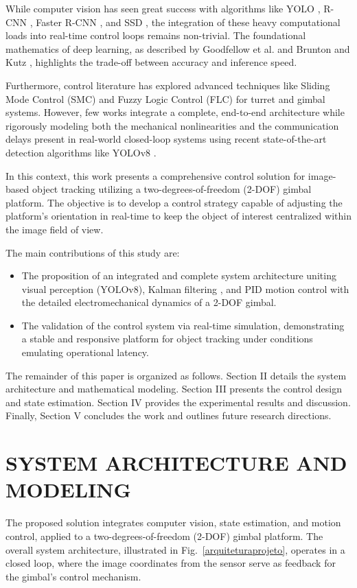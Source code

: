 \documentclass[conference]{IEEEtran}
\begin{document}
While computer vision has seen great success with algorithms like YOLO \cite{YOLO}, R-CNN \cite{6909475}, Faster R-CNN \cite{7485869}, and SSD \cite{Liu_2016}, the integration of these heavy computational loads into real-time control loops remains non-trivial. The foundational mathematics of deep learning, as described by Goodfellow et al. \cite{Goodfellow-et-al-2016} and Brunton and Kutz \cite{Brunton_Kutz_2022}, highlights the trade-off between accuracy and inference speed.

Furthermore, control literature has explored advanced techniques like Sliding Mode Control (SMC) \cite{Rahmat2016Sliding} and Fuzzy Logic Control (FLC) \cite{Galal2009Fuzzy} for turret and gimbal systems. However, few works integrate a complete, end-to-end architecture while rigorously modeling both the mechanical nonlinearities and the communication delays present in real-world closed-loop systems using recent state-of-the-art detection algorithms like YOLOv8 \cite{Jocher_Ultralytics_YOLO_2023}.

In this context, this work presents a comprehensive control solution for image-based object tracking utilizing a two-degrees-of-freedom (2-DOF) gimbal platform. The objective is to develop a control strategy capable of adjusting the platform's orientation in real-time to keep the object of interest centralized within the image field of view.

The main contributions of this study are:
\begin{itemize}
    \item The proposition of an integrated and complete system architecture uniting visual perception (YOLOv8), Kalman filtering \cite{Kalman1st}, and PID motion control with the detailed electromechanical dynamics of a 2-DOF gimbal.
    \item The validation of the control system via real-time simulation, demonstrating a stable and responsive platform for object tracking under conditions emulating operational latency.
\end{itemize}

The remainder of this paper is organized as follows. Section II details the system architecture and mathematical modeling. Section III presents the control design and state estimation. Section IV provides the experimental results and discussion. Finally, Section V concludes the work and outlines future research directions.

\section{SYSTEM ARCHITECTURE AND MODELING}
The proposed solution integrates computer vision, state estimation, and motion control, applied to a two-degrees-of-freedom (2-DOF) gimbal platform. The overall system architecture, illustrated in Fig.~\ref{arquiteturaprojeto}, operates in a closed loop, where the image coordinates from the sensor serve as feedback for the gimbal's control mechanism.
\end{document}
